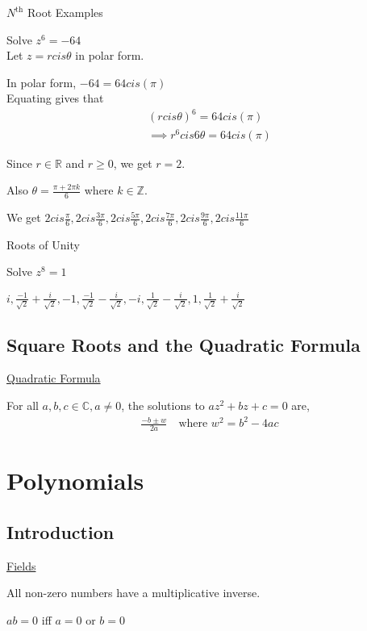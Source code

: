 \documentclass{article}
\begin{document}
$N^{\text{th}}$ Root Examples

Solve $z^6 = - 64$\\
Let $z = rcis\theta$ in polar form.

In polar form, $-64 = 64cis(\pi)$\\

Equating gives that
\begin{align*}
    (rcis\theta)^6 = 64cis(\pi)\\
    \implies r^6cis6\theta = 64cis(\pi)
\end{align*}

Since $r \in \mathbb{R}$ and $r \ge 0$, we get $r = 2$.

Also $\theta = \frac{\pi + 2\pi k}{6}$ where $k \in \mathbb{Z}$.

We get $2cis \frac{\pi}{6},2cis \frac{3\pi}{6}, 2cis\frac{5\pi}{6}, 2cis\frac{7\pi}{6}, 2cis\frac{9\pi}{6}, 2cis\frac{11\pi}{6}$

Roots of Unity

Solve $z^8 = 1$

$i, \frac{-1}{\sqrt{2}} + \frac{i}{\sqrt{2}}, -1, \frac{-1}{\sqrt{2}} - \frac{i}{\sqrt{2}}, -i, \frac{1}{\sqrt{2}} - \frac{i}{\sqrt{2}}, 1, \frac{1}{\sqrt{2}} + \frac{i}{\sqrt{2}}$

\subsection{Square Roots and the Quadratic Formula}

\underline{Quadratic Formula}

For all $a,b,c \in \mathbb{C}, a \ne 0$, the solutions to $az^2 + bz + c = 0$ are,
\begin{align*}
    \frac{-b\pm w}{2a} \quad \text{where } w^2 = b^2 - 4ac
\end{align*}

\section{Polynomials}

\subsection{Introduction}

\underline{Fields}

All non-zero numbers have a multiplicative inverse.

$ab = 0$ iff $a = 0$ or $b =0$
\end{document}
